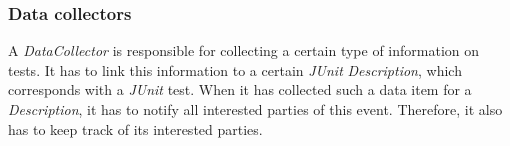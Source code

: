 \documentclass[i2]{oss}
\newcommand{\class}[1]{\emph{#1}}
\newcommand{\junit}{\emph{JUnit }}
\begin{document}




\subsubsection{Data collectors}

A \class{DataCollector} is responsible for collecting a certain type of information on tests.
It has to link this information to a certain \junit \class{Description}, which corresponds with a \junit test. 
When it has collected such a data item for a \class{Description}, it has to notify all interested parties of this event.
Therefore, it also has to keep track of its interested parties.
\end{document}

